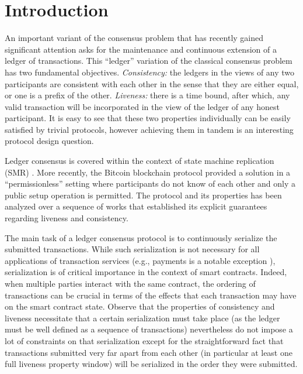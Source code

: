 \section{Introduction}
\label{sec:introduction}

An important variant of the consensus problem \cite{JACM:PeaShoLam80} that has recently gained significant attention asks for the maintenance and continuous extension of a ledger of transactions.
%
This ``ledger'' variation of the classical consensus problem has two fundamental objectives.
%
\emph{Consistency:} the ledgers in the views of any two participants are consistent with each other in the sense that they are either equal, or one is a prefix of the other.
%
\emph{Liveness:} there is a time bound, after which, any valid transaction will be incorporated in the view of the ledger of any honest participant.
%
It is easy to see that these two properties individually can be easily satisfied by trivial protocols, however achieving them in tandem is an interesting protocol design question.

Ledger consensus is covered within the context of state machine replication (SMR) \cite{CSUR:Schneider90}.
%
More recently, the Bitcoin blockchain protocol \cite{Nak08} provided a solution in a ``permissionless'' setting where participants do not know of each other and only a public setup operation is permitted.
%
The protocol and its properties has been analyzed over a sequence of works \cite{EC:GarKiaLeo15,EC:PasSeeash17,C:GarKiaLeo17} that established its explicit guarantees regarding liveness and consistency.

The main task of a ledger consensus protocol is to continuously serialize the submitted transactions.
%
While such serialization is not necessary for all applications of transaction services (e.g., payments is a notable exception \cite{NDSS:DanMei16,DC:GKMPS22}), serialization is of critical importance in the context of smart contracts.
%
Indeed, when multiple parties interact with the same contract, the ordering of transactions can be crucial in terms of the effects that each transaction may have on the smart contract state.
%
Observe that the properties of consistency and liveness necessitate that a certain serialization must take place (as the ledger must be well defined as a sequence of transactions) nevertheless do not impose a lot of constraints on that serialization except for the straightforward fact that transactions submitted very far apart from each other (in particular at least one full liveness property window) will be serialized in the order they were submitted.

